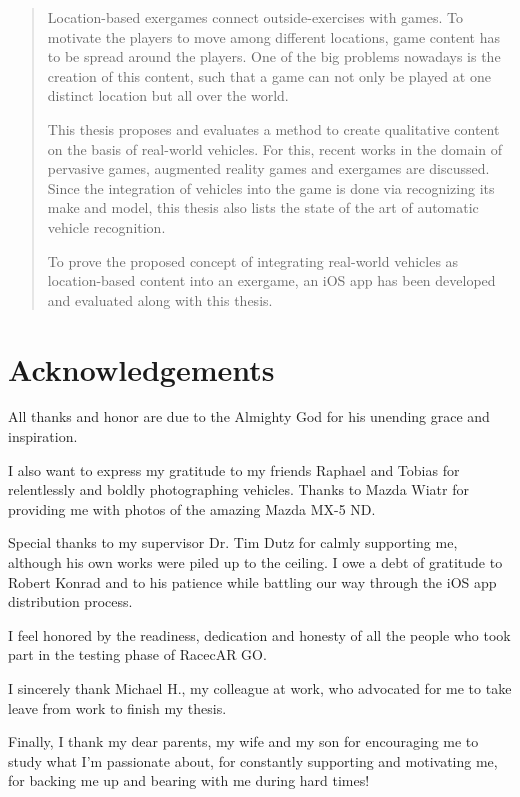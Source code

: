 \begin{abstract}
Location-based exergames connect outside-exercises with games. To motivate the players to move among different locations, game content has to be spread around the players. One of the big problems nowadays is the creation of this content, such that a game can not only be played at one distinct location but all over the world.
 
This thesis proposes and evaluates a method to create qualitative content on the basis of real-world vehicles. For this, recent works in the domain of pervasive games, augmented reality games and exergames are discussed. Since the integration of vehicles into the game is done via recognizing its make and model, this thesis also lists the state of the art of automatic vehicle recognition.
 
To prove the proposed concept of integrating real-world vehicles as location-based content into an exergame, an iOS app has been developed and evaluated along with this thesis.
\end{abstract}

\clearpage

\section*{Acknowledgements}
All thanks and honor are due to the Almighty God for his unending grace and inspiration.
 
I also want to express my gratitude to my friends Raphael and Tobias for relentlessly and boldly photographing vehicles. Thanks to Mazda Wiatr for providing me with photos of the amazing Mazda MX-5 ND.
 
Special thanks to my supervisor Dr. Tim Dutz for calmly supporting me, although his own works were piled up to the ceiling. I owe a debt of gratitude to Robert Konrad and to his patience while battling our way through the iOS app distribution process.
 
I feel honored by the readiness, dedication and honesty of all the people who took part in the testing phase of RacecAR GO.
 
I sincerely thank Michael H., my colleague at work, who advocated for me to take leave from work to finish my thesis.
 
Finally, I thank my dear parents, my wife and my son for encouraging me to study what I'm passionate about, for constantly supporting and motivating me, for backing me up and bearing with me during hard times!




